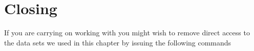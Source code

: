  
\section{Closing} 
 
If you are carrying on working with \R{} you might wish to remove direct access to the data sets we used in this chapter by issuing the following commands 
\begin{knitrout}
\color{fgcolor}\begin{kframe}
\begin{alltt}
\hlstd{> }
\end{alltt}
\end{kframe}
\end{knitrout}


